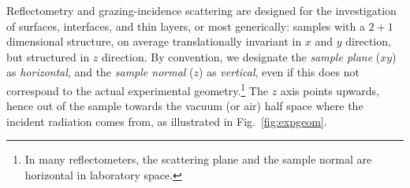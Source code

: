Reflectometry and grazing-incidence scattering
are designed for the investigation of surfaces, interfaces, and thin layers,
or most generically:
samples with a $2+1$ dimensional structure,
on average translationally invariant in $x$ and $y$ direction,
but structured in $z$ direction.
By convention,
we designate the \textit{sample plane} ($xy$) as \textit{horizontal},
%
%
and the \textit{sample normal} ($z$) as \textit{vertical},
%
%
even if this does not correspond to the actual experimental geometry.\footnote
{In many reflectometers,
 the scattering plane and the sample normal are horizontal in laboratory space.}
The $z$ axis points upwards, hence out of the sample towards the
vacuum (or air) half space where the incident radiation comes from,
as illustrated in Fig.~\ref{fig:expgeom}.

